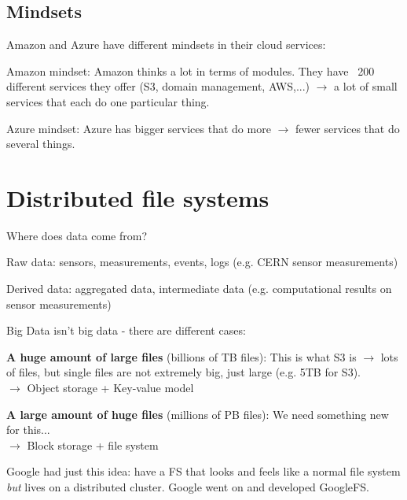 \documentclass[11pt,oneside,a4paper]{article}
\begin{document}
\subsection{Mindsets}

Amazon and Azure have different mindsets in their cloud services:

\begin{compactitem}
	\item Amazon mindset: Amazon thinks a lot in terms of modules. They have ~200 different services they offer (S3, domain management, AWS,...) $\rightarrow$ a lot of small services that each do one particular thing.
	\item Azure mindset: Azure has bigger services that do more $\rightarrow$ fewer services that do several things.\\
\end{compactitem}

\section{Distributed file systems}

Where does data come from?

\begin{compactitem}
	\item Raw data: sensors, measurements, events, logs (e.g. CERN sensor measurements)
	\item Derived data: aggregated data, intermediate data (e.g. computational results on sensor measurements)
\end{compactitem}

Big Data isn't big data - there are different cases:

\begin{compactitem}
	\item \textbf{A	huge amount of large files} (billions of TB files): This is what S3 is $\rightarrow$ lots of files, but single files are not extremely big, just large (e.g. 5TB for S3).\\
	$\rightarrow$ Object storage + Key-value model
	\item \textbf{A large amount of huge files} (millions of PB files): We need something new for this...\\
	$\rightarrow$ Block storage + file system
\end{compactitem}

Google had just this idea: have a FS that looks and feels like a normal file system \textit{but} lives on a distributed cluster. Google went on and developed GoogleFS.
\end{document}
